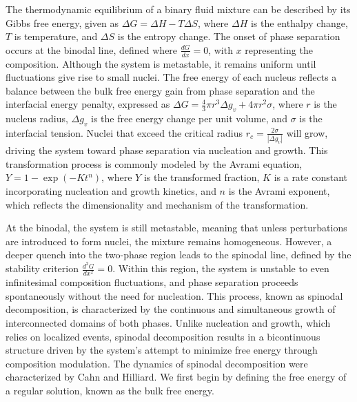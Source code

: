 The thermodynamic equilibrium of a binary fluid mixture can be described by its Gibbs free energy, given as \(\Delta G = \Delta H - T \Delta S\), where \(\Delta H\) is the enthalpy change, 
\(T\) is temperature, and \(\Delta S\) is the entropy change. The onset of phase separation occurs at the binodal line, defined where \(\frac{dG}{dx} = 0\), with \(x\) representing the composition. 
Although the system is metastable, it remains uniform until fluctuations give rise to small nuclei. The free energy of each nucleus reflects a 
balance between the bulk free energy gain from phase separation and the interfacial energy penalty, expressed as \(\Delta G = \frac{4}{3}\pi r^3 \Delta g_v + 4 \pi r^2 \sigma\), where \(r\) is 
the nucleus radius, \(\Delta g_v\) is the free energy change per unit volume, and \(\sigma\) is the interfacial tension. 
\cite{thanh_mechanisms_2014}
Nuclei that exceed the critical radius \(r_c = \frac{2\sigma}{|\Delta g_v|}\) will grow, driving the system toward phase separation via nucleation and growth. \cite{thanh_mechanisms_2014}
This transformation process is commonly modeled by the Avrami equation, \(Y = 1 - \exp(-K t^n)\), where \(Y\) is the 
transformed fraction, \(K\) is a rate constant incorporating nucleation and growth kinetics, and \(n\) is the Avrami exponent, which reflects the dimensionality and mechanism of the transformation.
\cite{avrami_kinetics_1939}

At the binodal, the system is still metastable, meaning that unless perturbations are introduced to form nuclei, the mixture remains homogeneous. \cite{thanh_mechanisms_2014}
However, a deeper quench into the two-phase region leads to the spinodal line, defined by the stability criterion \(\frac{d^2G}{dx^2} = 0\). \cite{cahn_free_1958}
Within this region, the system is unstable to even infinitesimal composition fluctuations, and phase 
separation proceeds spontaneously without the need for nucleation. This process, known as spinodal decomposition, is characterized by the continuous and simultaneous growth of interconnected 
domains of both phases. \cite{cahn_free_1958} Unlike nucleation and growth, which relies on localized events, spinodal decomposition 
results in a bicontinuous structure driven by the system's attempt to minimize 
free energy through composition modulation. \cite{cahn_free_1958} The dynamics of spinodal decomposition were characterized by Cahn and Hilliard. \cite{cahn_free_1958} 
We first begin by defining the free energy of a regular solution, known as the bulk free energy.

